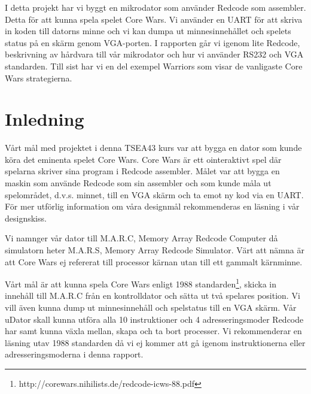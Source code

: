 \documentclass[11pt]{article}
\begin{document}
I detta projekt har vi byggt en mikrodator som använder Redcode som assembler. Detta för att kunna spela spelet Core Wars. Vi använder en UART för att skriva in koden till datorns minne och vi kan dumpa ut minnesinnehållet och spelets status på en skärm genom VGA-porten. I rapporten går vi igenom lite Redcode, beskrivning av hårdvara till vår mikrodator och hur vi använder RS232 och VGA standarden. Till sist har vi en del exempel Warriors som visar de vanligaste Core Wars strategierna.

\thispagestyle{empty}
\newpage


\tableofcontents

\thispagestyle{empty}
\newpage


\setcounter{page}{1}

\setlength{\parskip}{4mm plus1mm minus3mm}

\section{Inledning}

Vårt mål med projektet i denna TSEA43 kurs var att bygga en dator som kunde köra det eminenta spelet Core Wars. Core Wars är ett ointeraktivt spel där spelarna skriver sina program i Redcode assembler. Målet var att bygga en maskin som använde Redcode som sin assembler och som kunde måla ut spelområdet, d.v.s. minnet, till en VGA skärm och ta emot ny kod via en UART. För mer utförlig information om våra designmål rekommenderas en läsning i vår designskiss.

Vi namnger vår dator till M.A.R.C, Memory Array Redcode Computer då simulatorn heter M.A.R.S, Memory Array Redcode Simulator. Värt att nämna är att Core Wars ej refererat till processor kärnan utan till ett gammalt kärnminne.

Vårt mål är att kunna spela Core Wars enligt 1988 standarden\footnote{http://corewars.nihilists.de/redcode-icws-88.pdf}, skicka in innehåll till M.A.R.C från en kontrolldator och sätta ut två spelares position. Vi vill även kunna dump ut minnesinnehåll och spelstatus till en VGA skärm. Vår uDator skall kunna utföra alla 10 instruktioner och 4 adresseringsmoder Redcode har samt kunna växla mellan, skapa och ta bort processer. Vi rekommenderar en läsning utav 1988 standarden då vi ej kommer att gå igenom instruktionerna eller adresseringsmoderna i denna rapport.

\newpage
\end{document}
